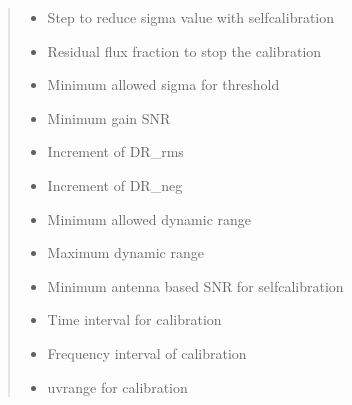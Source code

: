 \documentclass[letterpaper,10pt,english]{sphinxmanual}
\begin{document}
\begin{fulllineitems}
\begin{fulllineitems}
\begin{quote}
\begin{description}
\begin{itemize}
\item {} 
\sphinxAtStartPar
{} \textendash{} Step to reduce sigma value with self\sphinxhyphen{}calibration

\item {} 
\sphinxAtStartPar
{} \textendash{} Residual flux fraction to stop the calibration

\item {} 
\sphinxAtStartPar
{} \textendash{} Minimum allowed sigma for threshold

\item {} 
\sphinxAtStartPar
{} \textendash{} Minimum gain SNR

\item {} 
\sphinxAtStartPar
{} \textendash{} Increment of DR\_rms

\item {} 
\sphinxAtStartPar
{} \textendash{} Increment of DR\_neg

\item {} 
\sphinxAtStartPar
{} \textendash{} Minimum allowed dynamic range

\item {} 
\sphinxAtStartPar
{} \textendash{} Maximum dynamic range

\item {} 
\sphinxAtStartPar
{} \textendash{} Minimum antenna based SNR for self\sphinxhyphen{}calibration

\item {} 
\sphinxAtStartPar
{} \textendash{} Time interval for calibration

\item {} 
\sphinxAtStartPar
{} \textendash{} Frequency interval of calibration

\item {} 
\sphinxAtStartPar
{} \textendash{} uvrange for calibration

\end{itemize}


\end{description}\end{quote}

\end{fulllineitems}


\end{fulllineitems}
\end{document}
